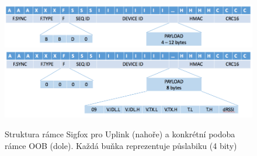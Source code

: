 \documentclass{ctuthesis}
\begin{document}
\begin{figure}
\caption{Struktura rámce Sigfox pro Uplink (nahoře) a konkrétní podoba rámce OOB (dole). Každá buňka reprezentuje půslabiku (4 bity)}
\includegraphics[width=1\textwidth]{./images/SigfoxFrameRx.png}
\includegraphics[width=1\textwidth]{./images/SigfoxFrameOobRx.png}
\label{sigfoxRxRamce}
\end{figure}
\end{document}
